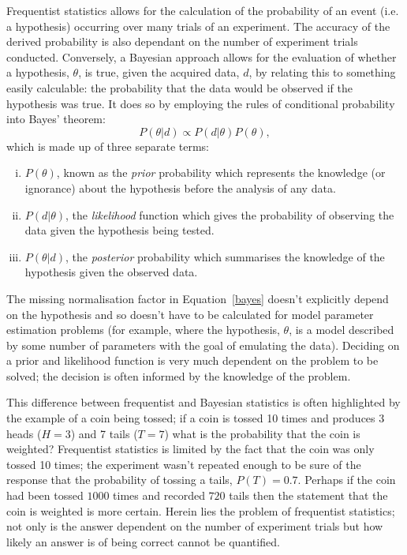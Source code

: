 Frequentist statistics allows {\minor for the calculation of} the probability of an event (i.e. a hypothesis) occurring over many trials of an experiment. The accuracy of the derived probability is also dependant on the number of experiment trials conducted. Conversely, a Bayesian approach allows {\minor for the evaluation of} whether a hypothesis, $\theta$, is true, given the {\minor acquired} data, $d$, by relating this to something easily {\minor calculable}: the probability that {\minor the data would be observed} if the hypothesis was true. It does so by employing the rules of conditional probability into Bayes' theorem:
\begin{equation}\label{bayes}
P(\theta|d) \propto P(d | \theta)P(\theta),
\end{equation}
which is made up of three separate terms: 
\begin{enumerate}[(i)]
\item $P(\theta)$, known as the \emph{prior} probability which represents {\minor the} knowledge (or ignorance) about the hypothesis before {\minor the analysis of} any data. 
\item $P(d  | \theta)$, the \emph{likelihood} function which gives the probability of observing the data given the hypothesis being tested. 
\item $P(\theta | d)$, the \emph{posterior} probability which summarises {\minor the} knowledge of the hypothesis given {\minor the} observed data.
\end{enumerate}
The missing normalisation factor in Equation~\ref{bayes} doesn't explicitly depend on {\minor the} hypothesis and so doesn't have to be calculated for model parameter estimation problems (for example, where {\minor the} hypothesis, $\theta$, is a model described by some number of parameters with the goal of emulating {\minor the} data). Deciding on a prior and likelihood function is very much dependent on the problem {\minor to be solved}; the decision is often informed by {\minor the} knowledge of the problem. 

This difference between frequentist and Bayesian statistics is often highlighted by the example of a coin being tossed; if {\minor a coin is tossed} 10 times and {\minor produces} 3 heads ($H=3$) and 7 tails ($T=7$) what is the probability that the coin is weighted? {\minor Frequentist statistics is limited} by the fact that {\minor the coin was only tossed 10 times}; the experiment {\minor wasn't repeated} enough to be sure of {\minor the} response that the probability of tossing a tails,  $P(T)=0.7$. Perhaps if the coin {\minor had been tossed} $1000$ times and recorded $720$ tails then the {\minor statement that the coin is weighted is more certain}. Herein lies the problem of frequentist statistics; not only is {\minor the} answer dependent on the number of experiment trials but how likely {\minor an} answer is of being correct {\minor cannot be quantified}. 

